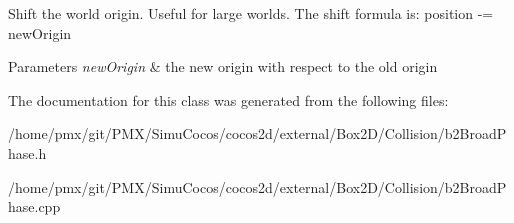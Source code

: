 Shift the world origin. Useful for large worlds. The shift formula is\+: position -\/= new\+Origin 
\begin{DoxyParams}{Parameters}
{\em new\+Origin} & the new origin with respect to the old origin \\
\hline
\end{DoxyParams}


The documentation for this class was generated from the following files\+:\begin{DoxyCompactItemize}
\item 
/home/pmx/git/\+P\+M\+X/\+Simu\+Cocos/cocos2d/external/\+Box2\+D/\+Collision/b2\+Broad\+Phase.\+h\item 
/home/pmx/git/\+P\+M\+X/\+Simu\+Cocos/cocos2d/external/\+Box2\+D/\+Collision/b2\+Broad\+Phase.\+cpp\end{DoxyCompactItemize}
